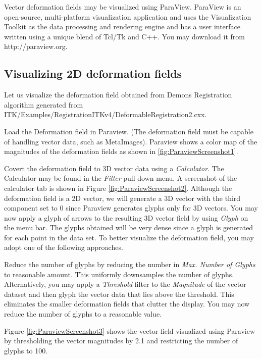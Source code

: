 %
%
%
%
%
%
Vector deformation fields may be visualized using ParaView.
ParaView \cite{ParaviewBook} is an open-source, multi-platform visualization application and uses the Visualization Toolkit as the data processing and rendering engine and has a user interface written using a unique blend of Tcl/Tk and C++. You may download it from http://paraview.org.

\subsection{Visualizing 2D deformation fields}
Let us visualize the deformation field obtained from Demons Registration algorithm generated from ITK/Examples/RegistrationITKv4/DeformableRegistration2.cxx.

Load the Deformation field in Paraview. (The deformation field must be capable of handling vector data, such as MetaImages). Paraview shows a color map of the magnitudes of the deformation fields as shown in \ref{fig:ParaviewScreenshot1}.

Covert the deformation field to 3D vector data using a {\it Calculator}. The Calculator may be found in the {\it Filter} pull down menu. A screenshot of the calculator tab is shown in Figure \ref{fig:ParaviewScreenshot2}. Although the deformation field is a 2D vector, we will generate a 3D vector with the third component set to 0 since Paraview generates glyphs only for 3D vectors. You may now apply a glyph of arrows to the resulting 3D vector field by using {\it Glyph} on the menu bar. The glyphs obtained will be very dense since a glyph is generated for each point in the data set. To better visualize the deformation field, you may adopt one of the following approaches.

Reduce the number of glyphs by reducing the number in {\it Max. Number of Glyphs} to reasonable amount. This uniformly downsamples the number of glyphs. Alternatively, you may apply a {\it Threshold} filter to the {\it Magnitude} of the vector dataset and then glyph the vector data that lies above the threshold. This eliminates the smaller deformation fields that clutter the display. You may now reduce the number of glyphs to a reasonable value.

Figure \ref{fig:ParaviewScreenshot3} shows the vector field visualized using Paraview by thresholding the vector magnitudes by 2.1 and restricting the number of glyphs to 100.

